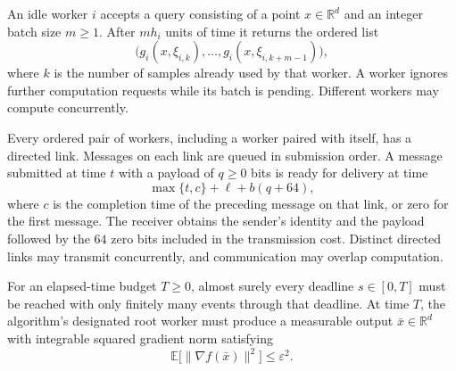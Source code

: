 \documentclass[10pt]{article}
\theoremstyle{definition}
\begin{document}
An idle worker $i$ accepts a query consisting of a point $x\in\mathbb{R}^d$ and an integer batch size $m\geq 1$. After $m h_i$ units of time it returns the ordered list
\[
\bigl(g_i(x,\xi_{i,k}),\ldots,g_i(x,\xi_{i,k+m-1})\bigr),
\]
where $k$ is the number of samples already used by that worker. A worker ignores further computation requests while its batch is pending. Different workers may compute concurrently.

Every ordered pair of workers, including a worker paired with itself, has a directed link. Messages on each link are queued in submission order. A message submitted at time $t$ with a payload of $q\geq 0$ bits is ready for delivery at time
\[
\max\{t,c\}+\ell+b(q+64),
\]
where $c$ is the completion time of the preceding message on that link, or zero for the first message. The receiver obtains the sender's identity and the payload followed by the $64$ zero bits included in the transmission cost. Distinct directed links may transmit concurrently, and communication may overlap computation.

For an elapsed-time budget $T\geq 0$, almost surely every deadline $s\in[0,T]$ must be reached with only finitely many events through that deadline. At time $T$, the algorithm's designated root worker must produce a measurable output $\bar{x}\in\mathbb{R}^d$ with integrable squared gradient norm satisfying
\[
\mathbb{E}\bigl[\|\nabla f(\bar{x})\|^2\bigr]\leq\varepsilon^2.
\]
\end{document}
